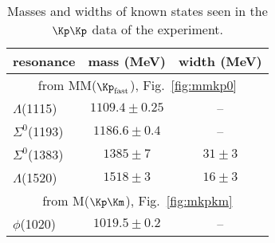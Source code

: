 \begin{table}
\begin{minipage}{\textwidth}
\begin{center}
\begin{singlespacing}

\caption[Known States in ]{\label{tab:known_states}Masses and widths of known states seen in the $\Kp\Kp$ data of the  experiment.}

\begin{tabular}{lcc}

\hline \hline

resonance & mass (MeV) & width (MeV) \\

\hline

\multicolumn{3}{c}{from MM($\Kp_\mathrm{fast}$), Fig.~\ref{fig:mmkp0}} \\
$\Lambda$(1115) & $1109.4\pm0.25$ & -- \\
$\Sigma^0$(1193) & $1186.6\pm0.4$ & -- \\
$\Sigma^0$(1383) & $1385\pm7$ & $31\pm3$ \\
$\Lambda$(1520) & $1518\pm3$ & $16\pm3$ \\

\hline

\multicolumn{3}{c}{from M($\Kp\Km$), Fig.~\ref{fig:mkpkm}} \\
$\phi$(1020) & $1019.5\pm0.2$ & -- \\

\hline \hline

\end{tabular}

\end{singlespacing}
\end{center}
\end{minipage}
\end{table}
\vspace{20pt}